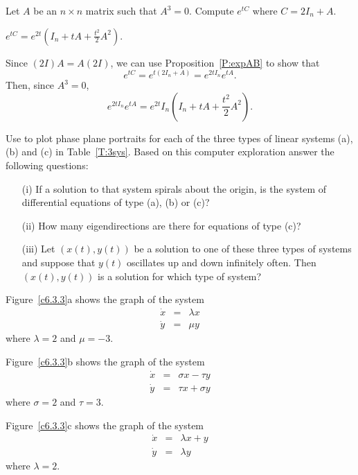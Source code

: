 \documentclass{ximera}
\begin{document}
\begin{exercise} \label{c6.3.25}
Let $A$ be an $n\times n$ matrix such that $A^3=0$.  Compute $e^{tC}$
where $C=2I_n+A$.

\begin{solution}

\ans $e^{tC} = e^{2t}(I_n + tA + \frac{t^2}{2}A^2)$.

\soln Since $(2I)A = A(2I)$, we can use Proposition~\ref{P:expAB} to
show that
\[
e^{tC} = e^{t(2I_n + A)} = e^{2tI_n}e^{tA}.
\]
Then, since $A^3 = 0$,
\[
e^{2tI_n}e^{tA} = e^{2t}I_n(I_n + tA + \frac{t^2}{2}A^2).
\]

\end{solution}
\end{exercise}

\CEXER

\begin{exercise} \label{c6.3.3}
Use {\pplane} to plot phase plane portraits for each of the
three types of linear systems (a), (b) and (c) in Table~\ref{T:3sys}.
Based on this computer exploration answer the following questions:
\begin{itemize}
\item[(i)]  If a solution to that system spirals about the origin,
is the system of differential equations of type (a), (b) or (c)?
\item[(ii)]  How many eigendirections are there for equations of type (c)?
\item[(iii)]  Let $(x(t),y(t))$ be a solution to one of these three types of
systems and suppose that $y(t)$ oscillates up and down infinitely often.
Then $(x(t),y(t))$ is a solution for which type of system?
\end{itemize}

\begin{solution}

Figure~\ref{c6.3.3}a shows the graph of the system
\[ \begin{array}{rrr}
\dot{x} & = & \lambda x \\ 
\dot{y} & = & \mu y \end{array} \]
where $\lambda = 2$ and $\mu = -3$.

\para Figure~\ref{c6.3.3}b shows the graph of the system
\[ \begin{array}{rrr}
\dot{x} & = & \sigma x - \tau y \\
\dot{y} & = & \tau x + \sigma y \end{array} \]
where $\sigma = 2$ and $\tau = 3$.

\para Figure~\ref{c6.3.3}c shows the graph of the system
\[ \begin{array}{rrr}
\dot{x} & = & \lambda x + y \\
\dot{y} & = & \lambda y \end{array} \]
where $\lambda = 2$.


\end{solution}
\end{exercise}
\end{document}
